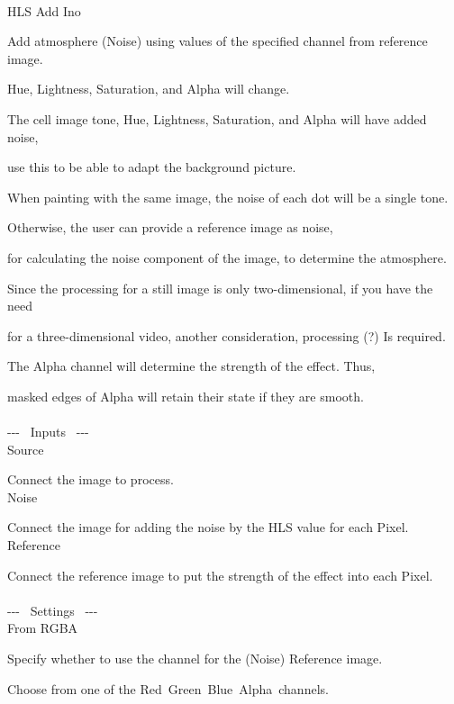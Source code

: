 \documentclass[a4paper,12pt]{article}
\begin{document}
\thispagestyle{empty}

\Large
\noindent \\
HLS Add Ino\medskip
\par
\normalsize
Add atmosphere (Noise) using values of the specified channel from reference image.\par
Hue, Lightness, Saturation, and Alpha will change.\\
\par
The cell image tone, Hue, Lightness, Saturation, and Alpha will have added noise,\par
use this to be able to adapt the background picture.\par
When painting with the same image, the noise of each dot will be a single tone.\par
Otherwise, the user can provide a reference image as noise,\par
for calculating the noise component of the image, to determine the atmosphere.
\\
\par
Since the processing for a still image is only two-dimensional, if you have the need\par
for a three-dimensional video, another consideration, processing (?) Is required.\\
\par
The Alpha channel will determine the strength of the effect. Thus,\par
masked edges of Alpha will retain their state if they are smooth.\\
\\
-{-}- \ Inputs \ -{-}-\\
Source\par
Connect the image to process.\\
Noise\par
Connect the image for adding the noise by the HLS value for each Pixel.\\
Reference\par
Connect the reference image to put the strength of the effect into each Pixel.\\
\\
-{-}- \ Settings \ -{-}-\\
From RGBA\par
Specify whether to use the channel for the (Noise) Reference image.\par
Choose from one of the \textquotedbl Red\textquotedbl \ \textquotedbl Green\textquotedbl \ \textquotedbl Blue\textquotedbl \ \textquotedbl Alpha\textquotedbl \ channels.\par
\end{document}

